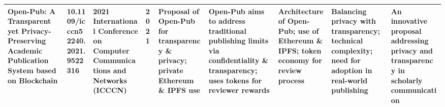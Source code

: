 \documentclass{article}
\begin{document}
\begin{landscape}
\begin{tabularx}{\linewidth}{|p{3.5cm}|p{2.5cm}|p{3cm}|p{1.8cm}|X|X|X|X|X|}
        Open-Pub: A Transparent yet Privacy-Preserving Academic Publication System based on Blockchain                                     & 10.1109/icccn52240.2021.9522316 & 2021 International Conference on Computer Communications and Networks (ICCCN) & 2021                      & Proposal of Open-Pub for transparency \& privacy; private Ethereum \& IPFS use                                              & Open-Pub aims to address traditional publishing limits via confidentiality \& transparency; uses tokens for reviewer rewards                   & Architecture of Open-Pub; use of Ethereum \& IPFS; token economy for review process                     & Balancing privacy with transparency; technical complexity; need for adoption in real-world publishing                               & An innovative proposal addressing privacy and transparency in scholarly communication                 \\
        \hline
    \end{tabularx}
\end{landscape}
\end{document}
